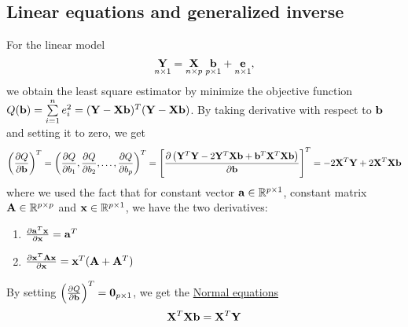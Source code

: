 \subsection*{Linear equations and generalized inverse}
For the linear model
$$
\underset{n \times 1}{\mathbf{Y}} = \underset{n \times p}{\mathbf{X}} \;  \underset{p \times 1}{\mathbf{b}} + \underset{n \times 1}{\mathbf{e}},
$$
we obtain the least square estimator by minimize the objective function $Q(\mathbf{b}) = \sum\limits_{i = 1}^n e_i^2 = (\mathbf{Y-Xb})^T(\mathbf{Y-Xb})$.
By taking derivative with respect to $\mathbf{b}$ and setting it to zero, we get
$$
\left( \frac{\partial Q}{\partial \mathbf{b}} \right) ^T = \left(
\frac{\partial Q}{\partial b_1},
\frac{\partial Q}{\partial b_2},
\dots,
\frac{\partial Q}{\partial b_p}
\right) ^T = \left[ \frac{\partial \left( \mathbf{Y}^T \mathbf{Y} - 2 \mathbf{Y}^T\mathbf{Xb} + \mathbf{b}^T\mathbf{X}^T \mathbf{Xb} \right)}{\partial \mathbf{b}} \right]^T = -2 \mathbf{X}^T \mathbf{Y} + 2\mathbf{X}^T\mathbf{Xb}
$$
where we used the fact that for constant vector $\mathbf{a} \in \mathbb{R}^{p \times 1}$, constant matrix $\mathbf{A} \in \mathbb{R}^{p \times p}$ and $\mathbf{x} \in \mathbb{R}^{p \times 1}$, we have the two derivatives:
\begin{enumerate}
	\item $\frac{\partial \mathbf{a}^T\mathbf{x}}{\partial \mathbf{x}} = \mathbf{a}^T$
	\item $\frac{\partial \mathbf{x}^T \mathbf{Ax}}{\partial \mathbf{x}} = \mathbf{x}^T(\mathbf{A} + \mathbf{A}^T)$
\end{enumerate}
By setting $\left( \frac{\partial Q}{\partial \mathbf{b}} \right) ^T = \mathbf{0}_{p \times 1}$, we get the \underline{Normal equations}
$$
\mathbf{X}^T\mathbf{Xb} = \mathbf{X}^T\mathbf{Y}
$$

